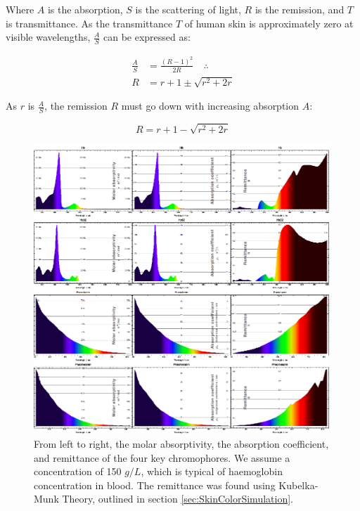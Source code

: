 Where $A$ is the absorption, $S$ is the scattering of light, $R$ is the remission, and $T$ is transmittance. As the transmittance $T$ of human skin is approximately zero at visible wavelengths, $\frac{A}{S}$ can be expressed as:

\begin{align}\label{eq:KubelkaMunk2}
\frac{A}{S} &=\frac{(R-1)^2}{2 R} \quad \therefore\\
R &= r+1 \pm \sqrt{r^2+2 r}
\end{align}

As $r$ is $\frac{A}{S}$, the remission $R$ must go down with increasing absorption $A$:

\begin{equation}\label{eq:KubelkaMunk3}
R = r+1 - \sqrt{r^2+2 r}
\end{equation}

\begin{figure}[h!]
  \centering
    \includegraphics[width=0.99\textwidth]{Chapter1/Figs/ChemicalSpectralProperties.eps}
    \caption{From left to right, the molar absorptivity, the absorption coefficient, and remittance of the four key chromophores. We assume a concentration of 150 $g/L$, which is typical of haemoglobin concentration in blood. The remittance was found using Kubelka-Munk Theory, outlined in section \ref{sec:SkinColorSimulation}. }  \label{fig:ChemicalSpectralProperties}
\end{figure}

